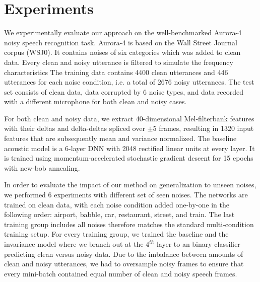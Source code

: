 \documentclass{article}
\begin{document}

\section{Experiments}
\label{sec:experiments}
We experimentally evaluate our approach   
on the well-benchmarked Aurora-4 \citep{parihar2002aurora} noisy speech recognition task. Aurora-4
is based on the Wall Street Journal corpus (WSJ0). It contains noises of 
six categories which was added to clean data. Every clean and noisy utterance is filtered to simulate the frequency characteristics %
%
The training
data  contains 4400 clean utterances and 446 utterances for each noise condition,
i.e. a total of 2676 noisy utterances.
The test set consists of clean data, data corrupted by 6 noise types, and data recorded with a different microphone for both clean and noisy cases.

For both clean and noisy data, we extract 40-dimensional Mel-filterbank features with their deltas and 
delta-deltas spliced over $\pm$5 frames, resulting in 1320 input 
features that are subsequently mean and variance normalized.  The baseline acoustic model is a  6-layer 
DNN with 2048 rectified linear units at every layer. It is trained using momentum-accelerated stochastic gradient descent for 15 epochs with new-bob annealing.


In order to evaluate the impact of our method on generalization to unseen noises,
we performed 6 experiments with different set of seen noises. The networks are trained
on clean data, with each noise condition added one-by-one in the following order: airport, babble, car, 
restaurant, street, and train. The last training group includes all noises therefore matches the
standard multi-condition training setup. For every training group, we trained the
baseline and the invariance model where we branch out at the $4^{th}$ layer to an  
binary classifier predicting clean versus noisy data. Due to the imbalance between amounts of clean and
noisy utterances, we had to oversample noisy frames to ensure that every mini-batch contained
equal number of clean and noisy speech frames.
\end{document}
